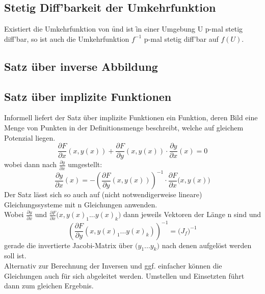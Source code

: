 \subsection{Stetig Diff'barkeit der Umkehrfunktion}
Existiert die Umkehrfunktion von \f und ist \f in einer Umgebung U p-mal stetig diff'bar, so ist auch die Umkehrfunktion $f^{-1}$ p-mal stetig diff'bar auf $f(U)$.

\subsection{Satz über inverse Abbildung}



\subsection{Satz über implizite Funktionen}
Informell liefert der Satz über implizite Funktionen ein Funktion, deren Bild eine Menge von Punkten in der Definitionsmenge beschreibt, welche auf gleichem Potenzial liegen.
\begin{equation*}
    {\frac {\partial F}{\partial x}}(x,y(x))+{\frac {\partial F}{\partial y}}(x,y(x))\cdot {\frac {\partial y}{\partial x}}(x)=0
\end{equation*}
wobei dann nach ${\frac {\partial y}{\partial x}}$ umgestellt:
\begin{equation*}
    {\frac {\partial y}{\partial x}}(x)=-\left({\frac {\partial F}{\partial y}}(x,y(x))\right)^{-1}\cdot {\frac {\partial F}{\partial x}}{\big (}x,y(x){\big )}
\end{equation*}
Der Satz lässt sich so auch auf (nicht notwendigerweise lineare) Gleichungssysteme mit n Gleichungen anwenden. \\
Wobei ${\frac {\partial y}{\partial x}}$ und ${\frac {\partial F}{\partial x}}{\big (}x,y(x)_1...y(x)_k{\big )}$ dann jeweils Vektoren der Länge n sind und 
\begin{equation*}
    \left({\frac {\partial F}{\partial y}}(x,y(x)_1...y(x)_k)\right)^{-1}={\big (}J_f{\big )}^{-1} 
\end{equation*}
gerade die invertierte Jacobi-Matrix über ${\big (}y_1...y_k{\big )}$
 nach denen aufgelöst werden soll ist. \\
 Alternativ zur Berechnung der Inversen und ggf. einfacher können die Gleichungen auch für sich abgeleitet werden. Umstellen und Einsetzten führt dann zum gleichen Ergebnis.

